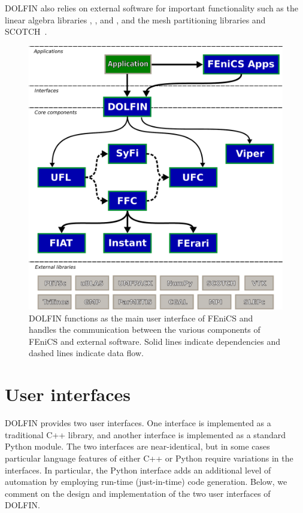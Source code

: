 DOLFIN also relies on external software for important functionality
such as the linear algebra libraries
\citet{www:petsc}, \citet{www:trilinos}, \citet{www:ublas} and \citet{www:mtl4}, and the
mesh partitioning libraries \citet{www:parmetis} and
SCOTCH~\citep{www:scotch}.
\begin{figure}
  \centering
  \includegraphics[width=\largefig]{chapters/logg-2/pdf/fenics-map.pdf}
  \caption{DOLFIN functions as the main user interface of FEniCS and
    handles the communication between the various components of FEniCS
    and external \hbox{software.} Solid lines indicate dependencies and
    dashed lines indicate data flow.}
  \label{fig:logg-2:fenicsmap}
\end{figure}

\section{User interfaces}

DOLFIN provides two user interfaces. One interface is implemented as a
traditional C++ library, and another interface is implemented as a
standard Python module. The two interfaces are near-identical, but in
some cases particular language features of either C++ or Python
require variations in the interfaces.  In particular, the Python
interface adds an additional level of automation by employing
run-time (just-in-time) code generation.  Below, we comment on the
design and implementation of the two user interfaces of DOLFIN.

